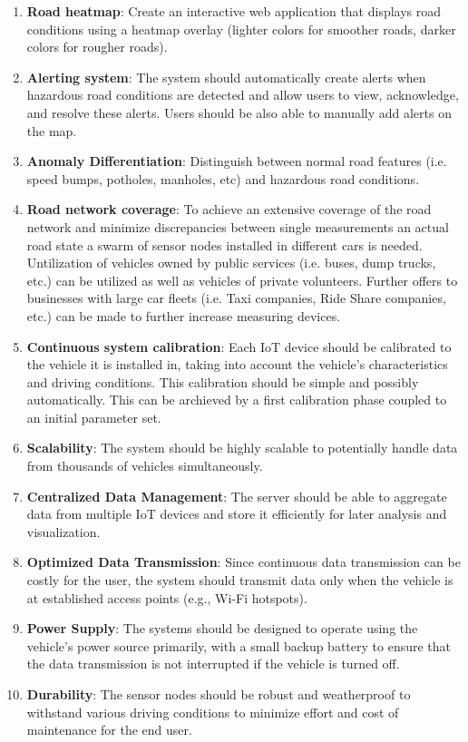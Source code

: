 \documentclass[12pt,a4paper]{article}
\begin{document}
\begin{enumerate}
\item \textbf{Road heatmap}: Create an interactive web application that displays road conditions using a heatmap overlay (lighter colors for smoother roads, darker colors for rougher roads).

\item \textbf{Alerting system}: The system should automatically create alerts when hazardous road conditions are detected and allow users to view, acknowledge, and resolve these alerts. Users should be also able to manually add alerts on the map.

\item \textbf{Anomaly Differentiation}: Distinguish between normal road features (i.e. speed bumps, potholes, manholes, etc) and hazardous road conditions.

\item \textbf{Road network coverage}: To achieve an extensive coverage of the road network and minimize discrepancies between single measurements an actual road state a swarm of sensor nodes installed in different cars is needed. Untilization of vehicles owned by public services (i.e. buses, dump trucks, etc.) can be utilized as well as vehicles of private volunteers. Further offers to businesses with large car fleets (i.e. Taxi companies, Ride Share companies, etc.) can be made to further increase measuring devices.

\item \textbf{Continuous system calibration}: Each IoT device should be calibrated to the vehicle it is installed in, taking into account the vehicle's characteristics and driving conditions. This calibration should be simple and possibly automatically. This can be archieved by a first calibration phase coupled to an initial parameter set.

\item \textbf{Scalability}: The system should be highly scalable to potentially handle data from thousands of vehicles simultaneously.

\item \textbf{Centralized Data Management}: The server should be able to aggregate data from multiple IoT devices and store it efficiently for later analysis and visualization.

\item \textbf{Optimized Data Transmission}: Since continuous data transmission can be costly for the user, the system should transmit data only when the vehicle is at established access points (e.g., Wi-Fi hotspots).

\item \textbf{Power Supply}: The systems should be designed to operate using the vehicle's power source primarily, with a small backup battery to ensure that the data transmission is not interrupted if the vehicle is turned off.

\item \textbf{Durability}: The sensor nodes should be robust and weatherproof to withstand various driving conditions to minimize effort and cost of maintenance for the end user.
\end{enumerate}
\end{document}
